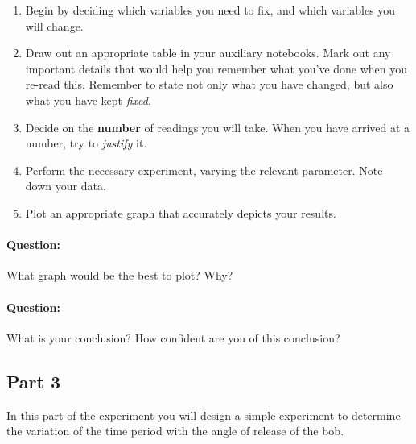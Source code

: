 \begin{enumerate}
    \item Begin by deciding which variables you need to fix, and which variables you will change.
    
    \item Draw out an appropriate table in your auxiliary notebooks. Mark out any important details that would help you remember what you've done when you re-read this. Remember to state not only what you have changed, but also what you have kept \textit{fixed}.
    
    \item Decide on the \textbf{number} of readings you will take. When you have arrived at a number, try to \textit{justify} it.
    
    \item Perform the necessary experiment, varying the relevant parameter. Note down your data.
    
    \item Plot an appropriate graph that accurately depicts your results.
\end{enumerate}


\begin{question}
\paragraph{Question:} What graph would be the best to plot? Why? ~\\

\paragraph{Question:} What is your conclusion? How confident are you of this conclusion?
\end{question}

\subsection{Part 3}

In this part of the experiment you will design a simple experiment to determine the variation of the time period with the angle of release of the bob.

